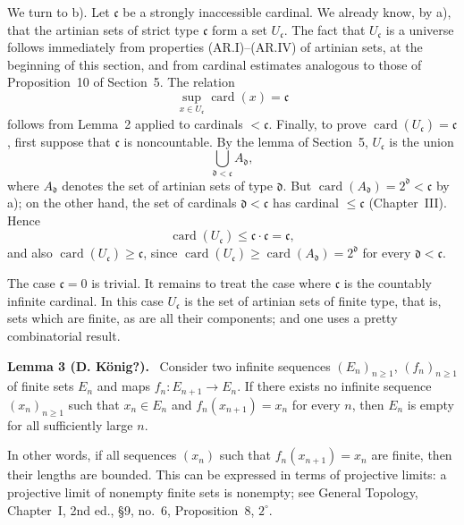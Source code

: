 \documentclass[11pt]{article}
\newcommand{\card}{\operatorname{card}}
\newenvironment{statement}[1]{\par\medskip\noindent\textbf{#1.}\ }{\par\medskip}
\begin{document}
We turn to b). Let \(\mathfrak c\) be a strongly inaccessible cardinal. We already know, by a), that the artinian sets of strict type \(\mathfrak c\) form a set \(U_{\mathfrak c}\). The fact that \(U_{\mathfrak c}\) is a universe follows immediately from properties (AR.I)--(AR.IV) of artinian sets, at the beginning of this section, and from cardinal estimates analogous to those of Proposition~10 of Section~5. The relation
\[
 \sup_{x\in U_{\mathfrak c}}\card(x)=\mathfrak c
\]
follows from Lemma~2 applied to cardinals \(<\mathfrak c\). Finally, to prove \(\card(U_{\mathfrak c})=\mathfrak c\), first suppose that \(\mathfrak c\) is noncountable. By the lemma of Section~5, \(U_{\mathfrak c}\) is the union
\[
 \bigcup_{\mathfrak d<\mathfrak c} A_{\mathfrak d},
\]
where \(A_{\mathfrak d}\) denotes the set of artinian sets of type \(\mathfrak d\). But \(\card(A_{\mathfrak d})=2^{\mathfrak d}<\mathfrak c\) by a); on the other hand, the set of cardinals \(\mathfrak d<\mathfrak c\) has cardinal \(\leq\mathfrak c\) (Chapter~III). Hence
\[
 \card(U_{\mathfrak c})\leq\mathfrak c\cdot\mathfrak c=\mathfrak c,
\]
and also \(\card(U_{\mathfrak c})\geq\mathfrak c\), since \(\card(U_{\mathfrak c})\geq\card(A_{\mathfrak d})=2^{\mathfrak d}\) for every \(\mathfrak d<\mathfrak c\).

The case \(\mathfrak c=0\) is trivial. It remains to treat the case where \(\mathfrak c\) is the countably infinite cardinal. In this case \(U_{\mathfrak c}\) is the set of artinian sets of finite type, that is, sets which are finite, as are all their components; and one uses a pretty combinatorial result.

\begin{statement}{Lemma 3 (D. K\"onig?)}
Consider two infinite sequences \((E_n)_{n\geq1}\), \((f_n)_{n\geq1}\) of finite sets \(E_n\) and maps \(f_n:E_{n+1}\to E_n\). If there exists no infinite sequence \((x_n)_{n\geq1}\) such that \(x_n\in E_n\) and \(f_n(x_{n+1})=x_n\) for every \(n\), then \(E_n\) is empty for all sufficiently large \(n\).
\end{statement}
In other words, if all sequences \((x_n)\) such that \(f_n(x_{n+1})=x_n\) are finite, then their lengths are bounded. This can be expressed in terms of projective limits: a projective limit of nonempty finite sets is nonempty; see General Topology, Chapter~I, 2nd ed., \S{}9, no.~6, Proposition~8, \(2^\circ\).
\end{document}
